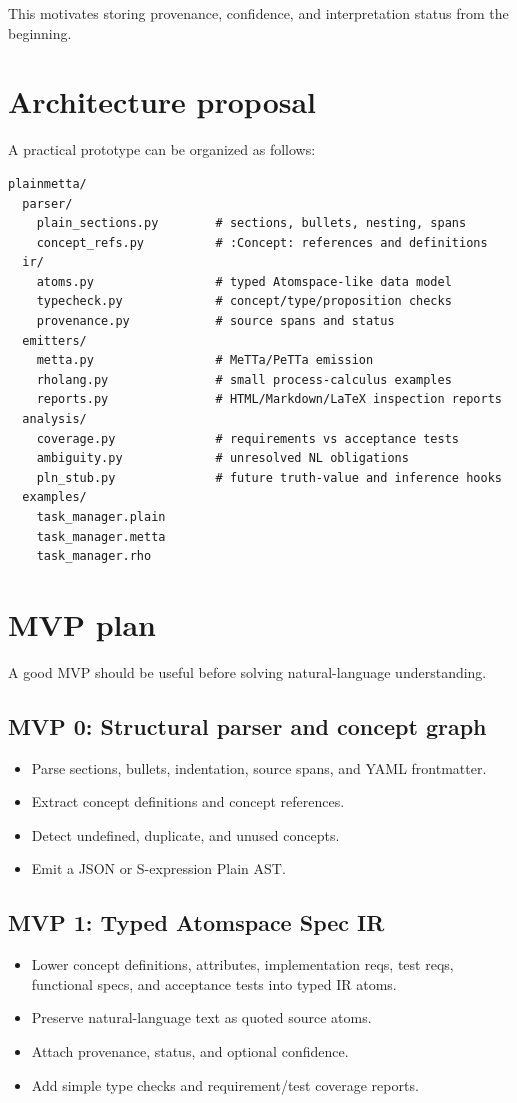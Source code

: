 \documentclass[11pt]{article}
\begin{document}
This motivates storing provenance, confidence, and interpretation status from
the beginning.

\section{Architecture proposal}

A practical prototype can be organized as follows:
\begin{verbatim}
plainmetta/
  parser/
    plain_sections.py        # sections, bullets, nesting, spans
    concept_refs.py          # :Concept: references and definitions
  ir/
    atoms.py                 # typed Atomspace-like data model
    typecheck.py             # concept/type/proposition checks
    provenance.py            # source spans and status
  emitters/
    metta.py                 # MeTTa/PeTTa emission
    rholang.py               # small process-calculus examples
    reports.py               # HTML/Markdown/LaTeX inspection reports
  analysis/
    coverage.py              # requirements vs acceptance tests
    ambiguity.py             # unresolved NL obligations
    pln_stub.py              # future truth-value and inference hooks
  examples/
    task_manager.plain
    task_manager.metta
    task_manager.rho
\end{verbatim}

\section{MVP plan}

A good MVP should be useful before solving natural-language understanding.

\subsection*{MVP 0: Structural parser and concept graph}
\begin{itemize}
  \item Parse sections, bullets, indentation, source spans, and YAML frontmatter.
  \item Extract concept definitions and concept references.
  \item Detect undefined, duplicate, and unused concepts.
  \item Emit a JSON or S-expression Plain AST.
\end{itemize}

\subsection*{MVP 1: Typed Atomspace Spec IR}
\begin{itemize}
  \item Lower concept definitions, attributes, implementation reqs, test reqs,
        functional specs, and acceptance tests into typed IR atoms.
  \item Preserve natural-language text as quoted source atoms.
  \item Attach provenance, status, and optional confidence.
  \item Add simple type checks and requirement/test coverage reports.
\end{itemize}
\end{document}
